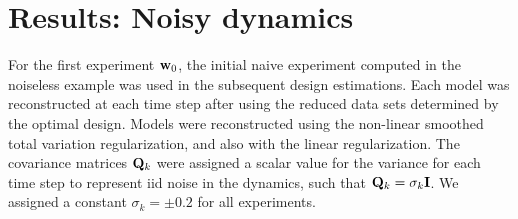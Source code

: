 \documentclass[11pt]{article}
\newcommand{\bfI}	{{\bf{I}}}
\newcommand{\bfQ}	{{\bf{Q}}}
\newcommand{\bfm}	{{\bf{m}}}
\newcommand{\bfw}	{{\bf{w}}}
\begin{document}


\section{Results: Noisy  dynamics}
\label{sec: Example2}
For the first experiment $\bfw_0$, the initial naive experiment computed in the noiseless example was used in the subsequent design estimations. Each model was reconstructed at each time step after using the reduced data sets determined by the optimal design. Models were reconstructed using the non-linear smoothed total variation regularization, and also with the linear regularization. 
The covariance matrices $\bfQ_k$ were assigned a scalar value for the variance for each time step to represent iid noise in the dynamics, such that $\bfQ_k = \sigma_k \bfI$. We assigned a constant $\sigma_k = \pm 0.2$ for all experiments. 
\end{document}
